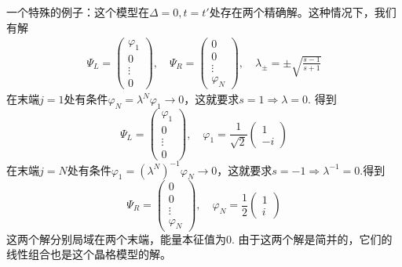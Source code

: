 \documentclass{article}
\numberwithin{equation}{subsection}
\begin{document}
一个特殊的例子：这个模型在$\Delta=0,t=t'$处存在两个精确解。这种情况下，我们有解
\begin{equation}
    \begin{aligned}
        \Psi_{L}=\left(\begin{array}{c}
        \varphi_{1} \\
        0 \\
        \vdots \\
        0
        \end{array}\right),\quad\Psi_{R}=\left(\begin{array}{c}
        0 \\
        0 \\
        \vdots \\
        \varphi_{N}
        \end{array}\right),\quad\lambda_{\pm}=\pm\sqrt{\frac{s-1}{s+1}}
        \end{aligned}
\end{equation}
在末端$j=1$处有条件$\varphi_N=\lambda^N\varphi_1\to0$，这就要求$s=1\Rightarrow\lambda=0$. 得到
\begin{equation}
    \Psi_{L}=\left(\begin{array}{c}
        \varphi_{1} \\
        0 \\
        \vdots \\
        0
        \end{array}\right),\quad\varphi_1=\frac{1}{\sqrt{2}}\begin{pmatrix}
            1\\
            -i
        \end{pmatrix}
\end{equation}
在末端$j=N$处有条件$\varphi_1=(\lambda^N)^{-1}\varphi_N\to0$，这就要求$s=-1\Rightarrow\lambda^{-1}=0$.得到
\begin{equation}
    \Psi_R=\begin{pmatrix}
        0\\
        0\\
        \vdots\\
        \varphi_N
    \end{pmatrix},\quad\varphi_N=\frac{1}{2}\begin{pmatrix}
        1\\
        i
    \end{pmatrix}
\end{equation}
这两个解分别局域在两个末端，能量本征值为$0$. 由于这两个解是简并的，它们的线性组合也是这个晶格模型的解。
\end{document}

